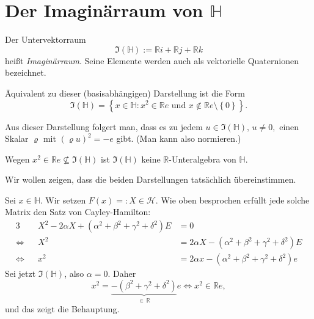 \documentclass[aspectratio=169]{beamer}
\newcommand{\Ham}{\ensuremath{\mathbb{H}}{ }}
\newcommand{\R}{\ensuremath{\mathbb{R}}{ }}
\begin{document}
    \section{Der Imaginärraum von \(\mathbb{H}\)}
    \begin{frame}
        \begin{definition}
            Der Untervektorraum
            \[
                \Im(\Ham) := \R i + \R j + \R k
            \]
            heißt \emph{Imaginärraum}.
            Seine Elemente werden auch als vektorielle Quaternionen bezeichnet.

            Äquivalent zu dieser (basisabhängigen) Darstellung ist die Form
            \[
                \Im(\Ham) = \left\{ x \in \Ham \colon x^2 \in \R e \text{ und } x \notin \R e \setminus \left\{ 0 \right\} \right\}
            .\] 
        \end{definition}

        Aus dieser Darstellung folgert man, dass es zu jedem \(u \in \Im(\Ham), \, u \neq 0,\) einen Skalar \(\varrho\) mit \((\varrho u)^2 = - e\) gibt.
        (Man kann also normieren.)

        Wegen \(x^2 \in \R e \nsubseteq \Im(\Ham)\) ist \(\Im(\Ham)\) keine \(\R\)-Unteralgebra von \(\Ham\).
    \end{frame}

    \begin{frame}
        Wir wollen zeigen, dass die beiden Darstellungen tatsächlich übereinstimmen.

        Sei \(x \in \Ham\).
        Wir setzen \(F(x) =: X \in \mathcal{H}\).
        Wie oben besprochen erfüllt jede solche Matrix den Satz von Cayley-Hamilton:
        \begin{alignat*}{3}
                 &&X^2 - 2 \alpha X + \left( \alpha^2 + \beta^2 + \gamma^2 + \delta^2 \right) E &= 0 \\
            \iff &&X^2 &= 2 \alpha X - \left( \alpha^2 + \beta^2 + \gamma^2 + \delta^2 \right) E \\
            \iff &&x^2 &= 2 \alpha x - \left( \alpha^2 + \beta^2 + \gamma^2 + \delta^2 \right) e
        \end{alignat*}
        Sei jetzt \(\Im(\Ham)\), also \(\alpha = 0\).
        Daher
        \[
            x^2 = \underbrace{- \left( \beta^2 + \gamma^2 + \delta^2 \right)}_{\in \, \R} e \iff x^2 \in \R e
        ,\] 
        und das zeigt die Behauptung.
    \end{frame}
\end{document}
